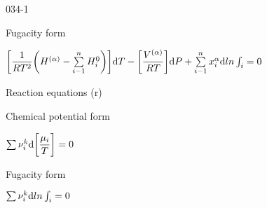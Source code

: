 \begin{mitframe}{034-1}
\begin{listone}
\begin{listtwo}
\begin{listthree}
		\end{listthree}
        
        \item Fugacity form

      	\begin{listthree}
            
            \item $\bigg[\dfrac{1}{\gasconst\Temp^2}\bigg(\enthalpy^{(\tdiff)}-\sum\limits_{i-1}^{n}\enthalpy_i^0\bigg)\bigg]\mathrm{d}\Temp-\bigg[\dfrac{\vol^{(\tdiff)}}{\gasconst\Temp}\bigg]\mathrm{d}\p+\sum\limits_{i-1}^{n}\specfrac{i}^{\tdiff}\mathrm{d}ln\int_{i}=0$          
		\end{listthree}
    
    \end{listtwo}
    
    \item Reaction equations (r)
    
    
    \begin{listtwo}

    	\item Chemical potential form

      	\begin{listthree}
            
            \item $\sum\nolimits\chargeval^{\thermcond}\mathrm{d}\bigg[\dfrac{\chempot_{i}}{\Temp}\bigg]=0$
            
		\end{listthree}
       
        \item Fugacity form

      	\begin{listthree}
            
            \item $\sum\nolimits\chargeval^{\thermcond}\mathrm{d}ln\int_{i}=0$          

		\end{listthree}
    
    \end{listtwo}               
    
\end{listone}

\end{mitframe}